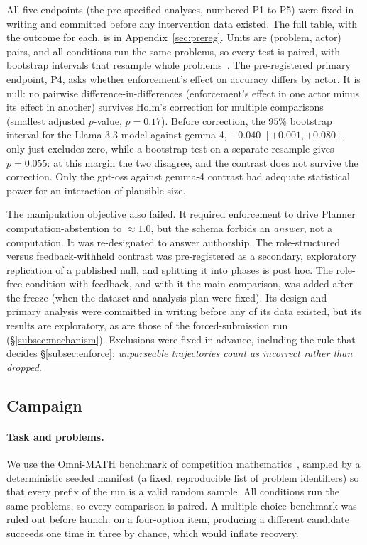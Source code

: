 All five endpoints (the pre-specified analyses, numbered P1 to P5) were
fixed in writing and committed before any intervention data existed. The full table, with the
outcome for each, is in Appendix~\ref{sec:prereg}. Units are (problem, actor) pairs,
and all conditions run the same problems, so every test is paired, with
bootstrap intervals that resample whole problems~\cite{efron1979bootstrap}.
The pre-registered primary endpoint, P4, asks whether enforcement's effect
on accuracy differs by actor. It is null: no pairwise
difference-in-differences (enforcement's effect in one actor minus its
effect in another) survives Holm's correction for multiple
comparisons~\cite{holm1979simple} (smallest adjusted $p$-value, $p=0.17$).
Before correction, the $95\%$ bootstrap interval for the Llama-3.3 model
against gemma-4, $+0.040$ $[+0.001,+0.080]$, only just excludes zero, while a
bootstrap test on a separate resample gives $p=0.055$: at this margin the two
disagree, and the contrast does not survive the correction. Only the gpt-oss against gemma-4 contrast had adequate
statistical power for an interaction of plausible size.

The \Pone{} manipulation objective also failed. It required enforcement to
drive Planner computation-abstention to ${\approx}1.0$, but the schema
forbids an \emph{answer}, not a computation. It was re-designated to answer
authorship. The role-structured versus feedback-withheld contrast was
pre-registered as a secondary, exploratory replication of a published null,
and splitting it into phases is post hoc. The role-free condition with
feedback, and with it the main comparison, was added after the freeze (when
the dataset and analysis plan were fixed). Its design and primary analysis
were committed in writing before any of its data existed, but its results
are exploratory, as are those of the forced-submission run
(\S\ref{subsec:mechanism}).
Exclusions were fixed in advance, including the rule that decides
\S\ref{subsec:enforce}: \emph{unparseable trajectories count as incorrect
rather than dropped}.

\subsection{Campaign}

\paragraph{Task and problems.} We use the Omni-MATH benchmark of competition
mathematics~\cite{gao2025omnimath}, sampled by a deterministic seeded
manifest (a fixed, reproducible list of problem identifiers) so that every
prefix of the run is a valid random sample. All conditions run the same
problems, so every comparison is paired. A multiple-choice benchmark was
ruled out before launch: on a four-option item, producing a different
candidate succeeds one time in three by chance, which would inflate
recovery.

